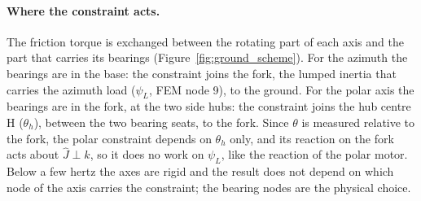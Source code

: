 \documentclass[10pt,a4paper]{article}
\numberwithin{equation}{section}
\begin{document}
\paragraph{Where the constraint acts.} The friction torque is exchanged between the rotating part of each axis and the part that carries its bearings (Figure~\ref{fig:ground_scheme}). For the azimuth the bearings are in the base: the constraint joins the fork, the lumped inertia that carries the azimuth load ($\psi_L$, FEM node 9), to the ground. For the polar axis the bearings are in the fork, at the two side hubs: the constraint joins the hub centre H ($\theta_h$), between the two bearing seats, to the fork. Since $\theta$ is measured relative to the fork, the polar constraint depends on $\theta_h$ only, and its reaction on the fork acts about $\hat J\perp\hat k$, so it does no work on $\psi_L$, like the reaction of the polar motor. Below a few hertz the axes are rigid and the result does not depend on which node of the axis carries the constraint; the bearing nodes are the physical choice.
\end{document}
